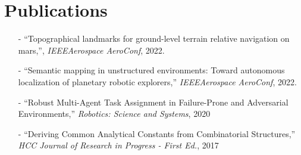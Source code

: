 \documentclass[letterpaper,11pt]{article}
\begin{document}
\section{Publications}
\small{
  \begin{itemize}
      \item[-] ``Topographical landmarks for ground-level terrain relative navigation on mars,'', \textit{IEEEAerospace AeroConf}, 2022.

      \item[-] ``Semantic  mapping in unstructured environments:  Toward autonomous localization of planetary robotic explorers,'' \textit{IEEEAerospace AeroConf}, 2022.

      \item[-] ``Robust Multi-Agent Task Assignment in Failure-Prone and Adversarial Environments,'' \textit{Robotics: Science and Systems}, 2020

      \item[-]``Deriving Common Analytical Constants from Combinatorial Structures,'' \textit{HCC Journal of Research in Progress - First Ed.}, 2017




  \end{itemize} 
}
\end{document}
